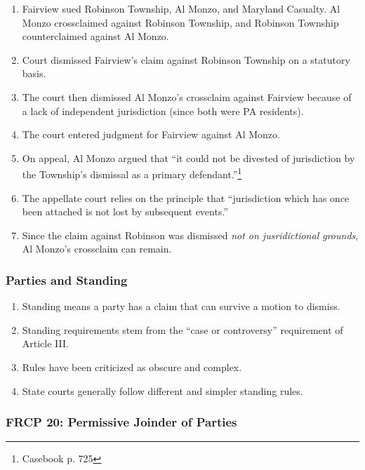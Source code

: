 \begin{enumerate}
    \item Fairview sued Robinson Township, Al Monzo, and Maryland Casualty. Al Monzo crossclaimed against Robinson Township, and Robinson Township counterclaimed against Al Monzo.
    \item Court dismissed Fairview's claim against Robinson Township on a statutory basis.
    \item The court then dismissed Al Monzo's crossclaim against Fairview because of a lack of independent jurisdiction (since both were PA residents).
    \item The court entered judgment for Fairview against Al Monzo. 
    \item On appeal, Al Monzo argued that ``it could not be divested of jurisdiction by the Township's dismissal as a primary defendant.''\footnote{Casebook p. 725} 
    \item The appellate court relies on the principle that ``jurisdiction which has once been attached is not lost by subsequent events.''
    \item Since the claim against Robinson was dismissed \emph{not on jusridictional grounds}, Al Monzo's crossclaim can remain.
\end{enumerate}

\subsubsection{Parties and Standing}

\begin{enumerate}
    \item Standing means a party has a claim that can survive a motion to dismiss.
    \item Standing requirements stem from the ``case or controversy'' requirement of Article III.
    \item Rules have been criticized as obscure and complex.
    \item State courts generally follow different and simpler standing rules.
\end{enumerate}

\subsubsection{FRCP 20: Permissive Joinder of Parties}


